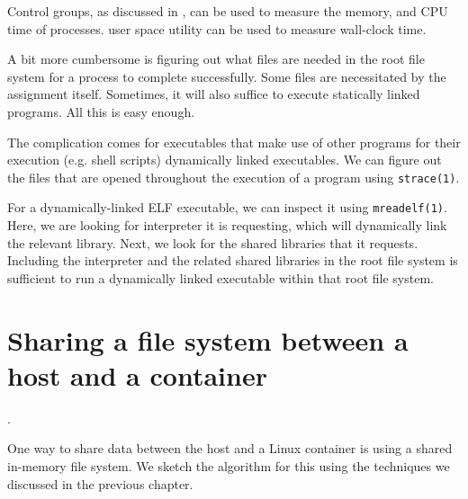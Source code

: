 Control groups, as discussed in , can
be used to measure the memory, and CPU time of processes. \cite{man-1-time}
user space utility can be used to measure wall-clock time.

A bit more cumbersome is figuring out what files are needed in the root file
system for a process to complete successfully. Some files are necessitated by
the assignment itself. Sometimes, it will also suffice to execute statically
linked programs. All this is easy enough.

The complication comes for executables that make use of other programs for
their execution (e.g. shell scripts) dynamically linked executables. We can
figure out the files that are opened throughout the execution of a program
using \texttt{strace(1)}.

For a dynamically-linked ELF executable, we can inspect it using
\texttt{mreadelf(1)}. Here, we are looking for interpreter it is requesting,
which will dynamically link the relevant library. Next, we look for the shared
libraries that it requests. Including the interpreter and the related shared
libraries in the root file system is sufficient to run a dynamically linked
executable within that root file system.

\section{Sharing a file system between a host and a container}.

One way to share data between the host and a Linux container is using a shared
in-memory file system. We sketch the algorithm for this using the techniques we
discussed in the previous chapter.

